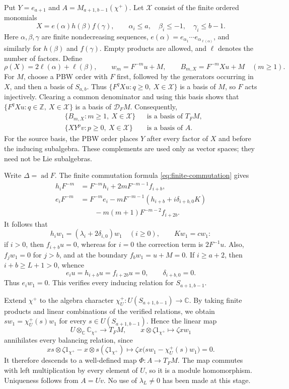 \documentclass[11pt]{article}
\newcommand{\C}{\mathbb C}
\newcommand{\Z}{\mathbb Z}
\newcommand{\ad}{\operatorname{ad}}
\newcommand{\D}{\mathcal D}
\theoremstyle{definition}
\begin{document}
Put \(Y=e_{a+1}\) and \(A=M_{a+1,b-1}(\chi^+)\). Let \(\mathcal X\)
consist of the finite ordered monomials
\[
 X=e(\alpha)h(\beta)f(\gamma),\qquad
 \alpha_i\le a,\quad\beta_i\le-1,\quad\gamma_i\le b-1.
\]
Here \(\alpha,\beta,\gamma\) are finite nondecreasing sequences,
\(e(\alpha)=e_{\alpha_1}\cdots e_{\alpha_{\ell(\alpha)}}\), and similarly
for \(h(\beta)\) and \(f(\gamma)\). Empty products are allowed, and
\(\ell\) denotes the number of factors. Define
\[
 \rho(X)=2\ell(\alpha)+\ell(\beta),\qquad
 w_m=F^{-m}u+M,\qquad B_{m,X}=F^{-m}Xu+M\quad(m\ge1).
\]
For \(M\), choose a PBW order with \(F\) first, followed by the
generators occurring in \(X\), and then a basis of \(S_{a,b}\). Thus
\(\{F^qXu:q\ge0,\ X\in\mathcal X\}\) is a basis of \(M\), so \(F\)
acts injectively. Clearing a common denominator and using this basis
shows that \(\{F^qXu:q\in\Z,\ X\in\mathcal X\}\) is a basis of
\(\D_FM\). Consequently,
\begin{equation}\label{eq:pbw-bases}
\begin{aligned}
 &\{B_{m,X}:m\ge1,\ X\in\mathcal X\}
     &&\text{is a basis of }T_FM,\\
 &\{XY^pv:p\ge0,\ X\in\mathcal X\}
     &&\text{is a basis of }A.
\end{aligned}
\end{equation}
For the source basis, the PBW order places \(Y\) after every factor of
\(X\) and before the inducing subalgebra. These complements are used
only as vector spaces; they need not be Lie subalgebras.

Write \(\Delta=\ad F\). The finite commutation formula
\eqref{eq:finite-commutation} gives
\[
\begin{aligned}
 h_iF^{-m}&=F^{-m}h_i+2mF^{-m-1}f_{i+b},\\
 e_iF^{-m}&=F^{-m}e_i
       -mF^{-m-1}(h_{i+b}+i\delta_{i+b,0}K)\\
 &\hspace{2em}-m(m+1)F^{-m-2}f_{i+2b}.
\end{aligned}
\]
It follows that
\[
 h_iw_1=(\lambda_i+2\delta_{i,0})w_1\quad(i\ge0),
 \qquad Kw_1=cw_1:
\]
if \(i>0\), then \(f_{i+b}u=0\), whereas for \(i=0\) the correction
term is \(2F^{-1}u\). Also, \(f_jw_1=0\) for \(j>b\), and at the
boundary \(f_bw_1=u+M=0\). If \(i\ge a+2\), then
\(i+b\ge L+1>0\), whence
\[
 e_iu=h_{i+b}u=f_{i+2b}u=0,\qquad\delta_{i+b,0}=0.
\]
Thus \(e_iw_1=0\). This verifies every inducing relation for
\(S_{a+1,b-1}\).

Extend \(\chi^+\) to the algebra character
\(\chi_U^+:U(S_{a+1,b-1})\to\C\). By taking finite products and linear
combinations of the verified relations, we obtain
\(sw_1=\chi_U^+(s)w_1\) for every \(s\in U(S_{a+1,b-1})\). Hence the
linear map
\[
 U\otimes_\C\C_{\chi^+}\longrightarrow T_FM,\qquad
 x\otimes\zeta1_{\chi^+}\longmapsto\zeta xw_1
\]
annihilates every balancing relation, since
\[
 xs\otimes\zeta1_{\chi^+}-x\otimes s(\zeta1_{\chi^+})
 \longmapsto
 \zeta x\bigl(sw_1-\chi_U^+(s)w_1\bigr)=0.
\]
It therefore descends to a well-defined map \(\Phi:A\to T_FM\).
The map commutes with left multiplication by every element of \(U\),
so it is a module homomorphism. Uniqueness follows from \(A=Uv\).
No use of \(\lambda_L\ne0\) has been made at this stage.
\end{document}
